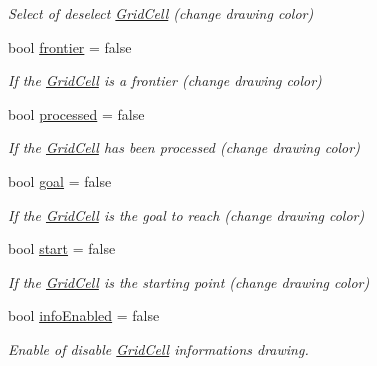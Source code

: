 \begin{DoxyCompactItemize}
\begin{DoxyCompactList}\small\item\em Select of deselect \hyperlink{classGridCell}{Grid\+Cell} (change drawing color) \end{DoxyCompactList}\item 
bool \hyperlink{classGridCell_ab8c610dccff54254896b67d34cb36b35}{frontier} = false\hypertarget{classGridCell_ab8c610dccff54254896b67d34cb36b35}{}\label{classGridCell_ab8c610dccff54254896b67d34cb36b35}

\begin{DoxyCompactList}\small\item\em If the \hyperlink{classGridCell}{Grid\+Cell} is a frontier (change drawing color) \end{DoxyCompactList}\item 
bool \hyperlink{classGridCell_acd279e15b141714d74586ba0a05e9d7b}{processed} = false\hypertarget{classGridCell_acd279e15b141714d74586ba0a05e9d7b}{}\label{classGridCell_acd279e15b141714d74586ba0a05e9d7b}

\begin{DoxyCompactList}\small\item\em If the \hyperlink{classGridCell}{Grid\+Cell} has been processed (change drawing color) \end{DoxyCompactList}\item 
bool \hyperlink{classGridCell_afe1b6d3afa06397f1732c07cfd9111ed}{goal} = false\hypertarget{classGridCell_afe1b6d3afa06397f1732c07cfd9111ed}{}\label{classGridCell_afe1b6d3afa06397f1732c07cfd9111ed}

\begin{DoxyCompactList}\small\item\em If the \hyperlink{classGridCell}{Grid\+Cell} is the goal to reach (change drawing color) \end{DoxyCompactList}\item 
bool \hyperlink{classGridCell_ac9fb7e6a84df215d9a3888428fe63425}{start} = false\hypertarget{classGridCell_ac9fb7e6a84df215d9a3888428fe63425}{}\label{classGridCell_ac9fb7e6a84df215d9a3888428fe63425}

\begin{DoxyCompactList}\small\item\em If the \hyperlink{classGridCell}{Grid\+Cell} is the starting point (change drawing color) \end{DoxyCompactList}\item 
bool \hyperlink{classGridCell_a2dbb35023dd7a201c1c02569204cfd2e}{info\+Enabled} = false\hypertarget{classGridCell_a2dbb35023dd7a201c1c02569204cfd2e}{}\label{classGridCell_a2dbb35023dd7a201c1c02569204cfd2e}

\begin{DoxyCompactList}\small\item\em Enable of disable \hyperlink{classGridCell}{Grid\+Cell} informations drawing. \end{DoxyCompactList}\end{DoxyCompactItemize}


